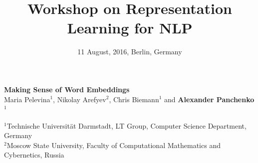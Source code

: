 \documentclass[accentcolor=tud9c,colorbacktitle,inverttitle,landscape,german,presentation]{tudbeamer}
\begin{document}
\title[]{Workshop on Representation Learning for NLP}
\subtitle{11 August, 2016, Berlin, Germany}

\begin{titleframe}
	\vspace{1cm}	
	\begin{center}
		\LARGE \alert{\textbf{	
			Making Sense of Word Embeddings \\
		}}	
		\vspace{0.7cm}
		\small Maria Pelevina$^1$, Nikolay Arefyev$^2$, Chris Biemann$^1$ and \textbf{Alexander Panchenko}$^1$
		
		\vspace{1.3cm}
		\scriptsize $^1$Technische Universit{\"a}t Darmstadt, LT Group, Computer Science Department, Germany\\
		
		\scriptsize $^2$Moscow State University, Faculty of Computational Mathematics and Cybernetics, Russia
	\end{center}
\end{titleframe}
\end{document}
